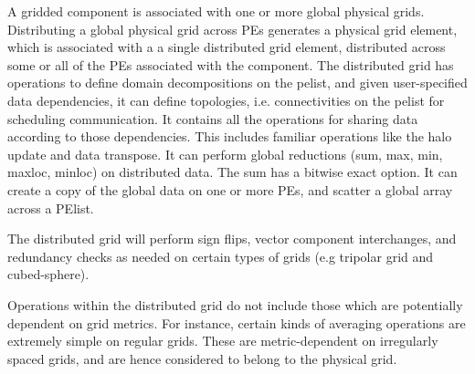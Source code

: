 A gridded component is associated with one or more global physical
grids.  Distributing a global physical grid across PEs generates a
physical grid element, which is associated with a a single
distributed grid element, distributed across some or all of the PEs
associated with the component. The distributed grid has operations to
define domain decompositions on the pelist, and given user-specified
data dependencies, it can define topologies, i.e. connectivities on
the pelist for scheduling communication. It contains all the
operations for sharing data according to those dependencies.  This
includes familiar operations like the halo update and data transpose.
It can perform global reductions (sum, max, min, maxloc, minloc) on
distributed data.  The sum has a bitwise exact option. It can create a
copy of the global data on one or more PEs, and scatter a global array
across a PElist.

The distributed grid will perform sign flips, vector component interchanges,
and redundancy checks as needed on certain types of grids (e.g
tripolar grid and cubed-sphere).

Operations within the distributed grid do not include those which are
potentially dependent on grid metrics. For instance, certain kinds of
averaging operations are extremely simple on regular grids. These are
metric-dependent on irregularly spaced grids, and are hence considered
to belong to the physical grid.

